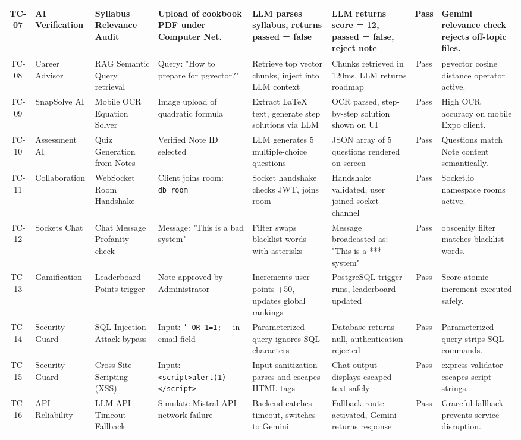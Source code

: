 \documentclass[12,Times new Roman,a4paper]{report}
\begin{document}
\begin{table}[htbp]
{\begin{tabular}{|c|p{2.5cm}|p{3.5cm}|p{3.0cm}|p{4.0cm}|p{4.0cm}|c|p{3.0cm}|}
\hline
TC-07 & AI Verification & Syllabus Relevance Audit & Upload of cookbook PDF under Computer Net. & LLM parses syllabus, returns passed = false & LLM returns score = 12, passed = false, reject note & Pass & Gemini relevance check rejects off-topic files. \\
\hline
TC-08 & Career Advisor & RAG Semantic Query retrieval & Query: "How to prepare for pgvector?" & Retrieve top vector chunks, inject into LLM context & Chunks retrieved in 120ms, LLM returns roadmap & Pass & pgvector cosine distance operator active. \\
\hline
TC-09 & SnapSolve AI & Mobile OCR Equation Solver & Image upload of quadratic formula & Extract LaTeX text, generate step solutions via LLM & OCR parsed, step-by-step solution shown on UI & Pass & High OCR accuracy on mobile Expo client. \\
\hline
TC-10 & Assessment AI & Quiz Generation from Notes & Verified Note ID selected & LLM generates 5 multiple-choice questions & JSON array of 5 questions rendered on screen & Pass & Questions match Note content semantically. \\
\hline
TC-11 & Collaboration & WebSocket Room Handshake & Client joins room: \texttt{db\_room} & Socket handshake checks JWT, joins room & Handshake validated, user joined socket channel & Pass & Socket.io namespace rooms active. \\
\hline
TC-12 & Sockets Chat & Chat Message Profanity check & Message: "This is a bad system" & Filter swaps blacklist words with asterisks & Message broadcasted as: "This is a *** system" & Pass & obscenity filter matches blacklist words. \\
\hline
TC-13 & Gamification & Leaderboard Points trigger & Note approved by Administrator & Increments user points +50, updates global rankings & PostgreSQL trigger runs, leaderboard updated & Pass & Score atomic increment executed safely. \\
\hline
TC-14 & Security Guard & SQL Injection Attack bypass & Input: \texttt{' OR 1=1; --} in email field & Parameterized query ignores SQL characters & Database returns null, authentication rejected & Pass & Parameterized query strips SQL commands. \\
\hline
TC-15 & Security Guard & Cross-Site Scripting (XSS) & Input: \texttt{<script>alert(1)</script>} & Input sanitization parses and escapes HTML tags & Chat output displays escaped text safely & Pass & express-validator escapes script strings. \\
\hline
TC-16 & API Reliability & LLM API Timeout Fallback & Simulate Mistral API network failure & Backend catches timeout, switches to Gemini & Fallback route activated, Gemini returns response & Pass & Graceful fallback prevents service disruption. \\
\hline
\end{tabular}%
}
\end{table}
\end{document}
